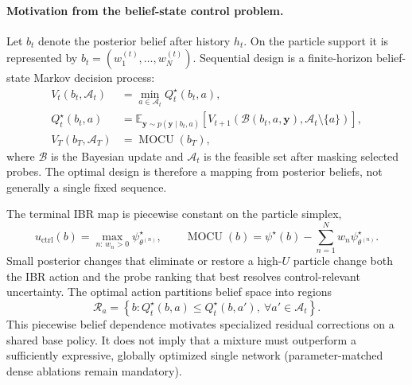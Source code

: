 \documentclass[11pt]{article}
\begin{document}
\paragraph{Motivation from the belief-state control problem.}
Let \(b_t\) denote the posterior belief after history \(h_t\). On the particle
support it is represented by \(b_t=(w_1^{(t)},\ldots,w_N^{(t)})\). Sequential
design is a finite-horizon belief-state Markov decision process:
\begin{align}
V_t(b_t,\mathcal A_t)
&=\min_{a\in\mathcal A_t}Q_t^\star(b_t,a),
\label{eq:moe_bellman_value}\\
Q_t^\star(b_t,a)
&=\mathbb E_{\mathbf y\sim p(\mathbf y\mid b_t,a)}
\left[V_{t+1}\!\left(\mathcal B(b_t,a,\mathbf y),
\mathcal A_t\setminus\{a\}\right)\right],
\label{eq:moe_bellman_q}\\
V_T(b_T,\mathcal A_T)&=\operatorname{MOCU}(b_T),
\label{eq:moe_bellman_terminal}
\end{align}
where \(\mathcal B\) is the Bayesian update and \(\mathcal A_t\) is the
feasible set after masking selected probes. The optimal design is therefore a
mapping from posterior beliefs, not generally a single fixed sequence.

The terminal IBR map is piecewise constant on the particle simplex,
\begin{equation}
u_{\mathrm{ctrl}}(b)
=
\max_{n:\,w_n>0}\psi_{\theta^{(n)}}^\star,
\qquad
\operatorname{MOCU}(b)
=
\psi^\star(b)-\sum_{n=1}^{N}w_n \psi_{\theta^{(n)}}^\star.
\label{eq:moe_piecewise_control}
\end{equation}
Small posterior changes that eliminate or restore a high-\(U\) particle change
both the IBR action and the probe ranking that best resolves control-relevant
uncertainty. The optimal action partitions belief space into regions
\begin{equation}
\mathcal R_a=\left\{b:Q_t^\star(b,a)\le Q_t^\star(b,a'),\ 
\forall a'\in\mathcal A_t\right\}.
\label{eq:moe_belief_regions}
\end{equation}
This piecewise belief dependence motivates specialized residual corrections on
a shared base policy. It does not imply that a mixture must outperform a
sufficiently expressive, globally optimized single network
(parameter-matched dense ablations remain mandatory).
\end{document}
